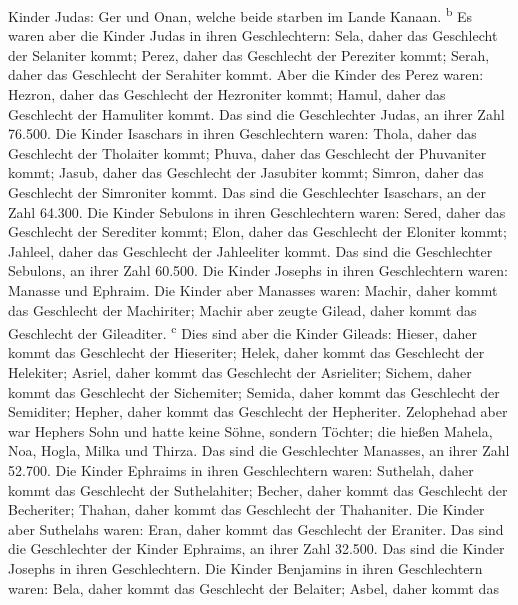 Kinder Judas: Ger und Onan, welche beide starben im Lande Kanaan.
\textsuperscript{b}  Es waren aber die Kinder Judas in
ihren Geschlechtern: Sela, daher das Geschlecht der Selaniter kommt;
Perez, daher das Geschlecht der Pereziter kommt; Serah, daher das
Geschlecht der Serahiter kommt.  Aber die Kinder des
Perez waren: Hezron, daher das Geschlecht der Hezroniter kommt; Hamul,
daher das Geschlecht der Hamuliter kommt.  Das sind die
Geschlechter Judas, an ihrer Zahl 76.500.  Die Kinder
Isaschars in ihren Geschlechtern waren: Thola, daher das Geschlecht der
Tholaiter kommt; Phuva, daher das Geschlecht der Phuvaniter kommt;
 Jasub, daher das Geschlecht der Jasubiter kommt; Simron,
daher das Geschlecht der Simroniter kommt.  Das sind die
Geschlechter Isaschars, an der Zahl 64.300.  Die Kinder
Sebulons in ihren Geschlechtern waren: Sered, daher das Geschlecht der
Serediter kommt; Elon, daher das Geschlecht der Eloniter kommt; Jahleel,
daher das Geschlecht der Jahleeliter kommt.  Das sind die
Geschlechter Sebulons, an ihrer Zahl 60.500.  Die Kinder
Josephs in ihren Geschlechtern waren: Manasse und Ephraim.
 Die Kinder aber Manasses waren: Machir, daher kommt das
Geschlecht der Machiriter; Machir aber zeugte Gilead, daher kommt das
Geschlecht der Gileaditer. \textsuperscript{c}  Dies sind
aber die Kinder Gileads: Hieser, daher kommt das Geschlecht der
Hieseriter; Helek, daher kommt das Geschlecht der Helekiter;
 Asriel, daher kommt das Geschlecht der Asrieliter;
Sichem, daher kommt das Geschlecht der Sichemiter; 
Semida, daher kommt das Geschlecht der Semiditer; Hepher, daher kommt
das Geschlecht der Hepheriter.  Zelophehad aber war
Hephers Sohn und hatte keine Söhne, sondern Töchter; die hießen Mahela,
Noa, Hogla, Milka und Thirza.  Das sind die Geschlechter
Manasses, an ihrer Zahl 52.700.  Die Kinder Ephraims in
ihren Geschlechtern waren: Suthelah, daher kommt das Geschlecht der
Suthelahiter; Becher, daher kommt das Geschlecht der Becheriter; Thahan,
daher kommt das Geschlecht der Thahaniter.  Die Kinder
aber Suthelahs waren: Eran, daher kommt das Geschlecht der Eraniter.
 Das sind die Geschlechter der Kinder Ephraims, an ihrer
Zahl 32.500. Das sind die Kinder Josephs in ihren Geschlechtern.
 Die Kinder Benjamins in ihren Geschlechtern waren: Bela,
daher kommt das Geschlecht der Belaiter; Asbel, daher kommt das
